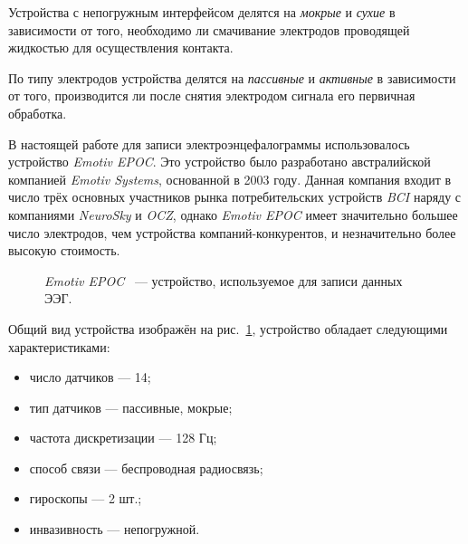\documentclass[12pt,a4paper,oneside,fleqn,leqno]{article}
\begin{document}
	\par Устройства с непогружным интерфейсом делятся на {\it мокрые} и {\it сухие} в зависимости от того, необходимо ли смачивание электродов проводящей жидкостью для осуществления контакта.
	\par По типу электродов устройства делятся на {\it пассивные} и {\it активные} в зависимости от того, производится ли после снятия электродом сигнала его первичная обработка.

	
	\par В настоящей работе для записи электроэнцефалограммы использовалось устройство {\it Emotiv EPOC}. Это устройство было разработано австралийской компанией {\it Emotiv Systems}, основанной в 2003 году. Данная компания входит в число трёх основных участников рынка потребительских устройств {\it BCI} наряду с компаниями {\it NeuroSky} и {\it OCZ}, однако {\it Emotiv EPOC} имеет значительно большее число электродов, чем устройства компаний-конкурентов, и незначительно более высокую стоимость. 
\begin{figure}[h!]
\caption{{\it Emotiv EPOC} ~--- устройство, используемое для записи данных ЭЭГ.}
\label{Emotiv}
\end{figure}

	\par Общий вид устройства изображён на рис.~\ref{Emotiv}, устройство обладает следующими характеристиками:
	\begin{itemize}\itemsep0pt
	\item
	число датчиков — 14;
	\item
	тип датчиков — пассивные, мокрые;
	\item
	частота дискретизации — 128 Гц;
	\item
	способ связи — беспроводная радиосвязь;
	\item
	гироскопы — 2 шт.;
	\item
	инвазивность — непогружной.
	\end{itemize}
\end{document}
